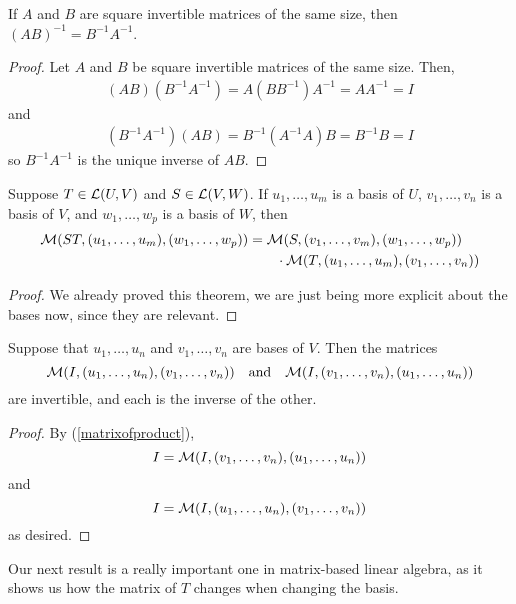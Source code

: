 \begin{theorem}
    If $A$ and $B$ are square invertible matrices of the same size, then $(AB)^{-1} = B^{-1}A^{-1}$.
\end{theorem}
\begin{proof}
    Let $A$ and $B$ be square invertible matrices of the same size. Then,
    \begin{align*}
        (AB)(B^{-1}A^{-1}) = A(BB^{-1})A^{-1} = AA^{-1} = I
    \end{align*}
    and
    \begin{align*}
        (B^{-1}A^{-1})(AB) = B^{-1}(A^{-1}A)B = B^{-1}B = I
    \end{align*}
    so $B^{-1}A^{-1}$ is the unique inverse of $AB$.    
\end{proof}
\begin{theorem} \label{matrixofproduct}
    Suppose $T\in\mathcal{L}(U,V)$ and $S\in\mathcal{L}(V,W)$. If $u_1, \dots, u_m$ is a basis of $U$, $v_1, \dots, v_n$ is a basis of $V$, and $w_1, \dots, w_p$ is a basis of $W$, then 
    \begin{align*}
        \mathcal{M}(ST, (u_1, \dots, u_m), (w_1, \dots, w_p)) &= \mathcal{M}(S, (v_1, \dots, v_m), (w_1, \dots, w_p))\\ &\qquad\cdot \mathcal{M}(T, (u_1, \dots, u_m), (v_1, \dots, v_n))
    \end{align*}
\end{theorem}
\begin{proof}
    We already proved this theorem, we are just being more explicit about the bases now, since they are relevant.
\end{proof}
\begin{theorem} \label{matrix of identity}
    Suppose that $u_1, \dots, u_n$ and $v_1, \dots, v_n$ are bases of $V$. Then the matrices
    \[ \mathcal{M}(I, (u_1, \dots, u_n), (v_1, \dots, v_n))\quad\text{and}\quad \mathcal{M}(I, (v_1, \dots, v_n), (u_1, \dots, u_n)) \]
    are invertible, and each is the inverse of the other. 
\end{theorem}
\begin{proof}
    By (\ref{matrixofproduct}), 
    \[ I = \mathcal{M}(I, (v_1, \dots, v_n), (u_1, \dots, u_n))\]
    and 
    \[ I = \mathcal{M}(I, (u_1, \dots, u_n), (v_1, \dots, v_n)) \]
    as desired.     
\end{proof}
Our next result is a really important one in matrix-based linear algebra, as it shows us how the matrix of $T$ changes when changing the basis. 
